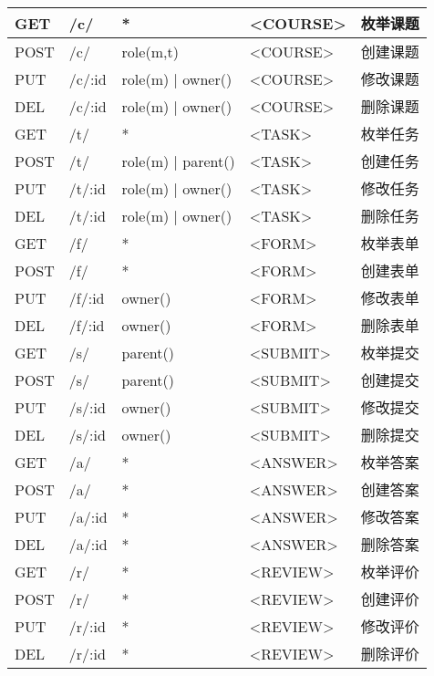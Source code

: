 \begin{longtable}{|p{1.2cm}|p{3cm}|p{3cm}|p{4cm}|X|}
  GET  & /c/    & *                 & <COURSE> & 枚举课题 \\ \hline
  POST & /c/    & role(m,t)         & <COURSE> & 创建课题 \\ \hline
  PUT  & /c/:id & role(m) | owner() & <COURSE> & 修改课题 \\ \hline
  DEL  & /c/:id & role(m) | owner() & <COURSE> & 删除课题 \\ \hline

  GET  & /t/    & *                  & <TASK> & 枚举任务 \\ \hline
  POST & /t/    & role(m) | parent() & <TASK> & 创建任务 \\ \hline
  PUT  & /t/:id & role(m) | owner()  & <TASK> & 修改任务 \\ \hline
  DEL  & /t/:id & role(m) | owner()  & <TASK> & 删除任务 \\ \hline

  GET  & /f/    & *       & <FORM> & 枚举表单 \\ \hline
  POST & /f/    & *       & <FORM> & 创建表单 \\ \hline
  PUT  & /f/:id & owner() & <FORM> & 修改表单 \\ \hline
  DEL  & /f/:id & owner() & <FORM> & 删除表单 \\ \hline

  GET  & /s/    & parent() & <SUBMIT> & 枚举提交 \\ \hline
  POST & /s/    & parent() & <SUBMIT> & 创建提交 \\ \hline
  PUT  & /s/:id & owner()  & <SUBMIT> & 修改提交 \\ \hline
  DEL  & /s/:id & owner()  & <SUBMIT> & 删除提交 \\ \hline

  GET  & /a/    & * & <ANSWER> & 枚举答案 \\ \hline
  POST & /a/    & * & <ANSWER> & 创建答案 \\ \hline
  PUT  & /a/:id & * & <ANSWER> & 修改答案 \\ \hline
  DEL  & /a/:id & * & <ANSWER> & 删除答案 \\ \hline

  GET  & /r/    & * & <REVIEW> & 枚举评价 \\ \hline
  POST & /r/    & * & <REVIEW> & 创建评价 \\ \hline
  PUT  & /r/:id & * & <REVIEW> & 修改评价 \\ \hline
  DEL  & /r/:id & * & <REVIEW> & 删除评价 \\ \hline


\end{longtable}
